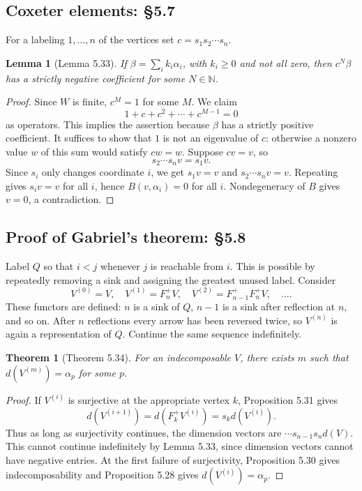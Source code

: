 \documentclass[UTF8,11pt,a4paper]{ctexart}
\newtheorem*{theorem}{Theorem}
\newtheorem*{lemma}{Lemma}
\theoremstyle{definition}\newtheorem*{definition}{Definition}
\theoremstyle{remark}\newtheorem*{remark}{Remark}
\newcommand{\N}{\mathbb N}
\begin{document}
\subsection*{Coxeter elements: §5.7}
For a labeling $1,\ldots,n$ of the vertices set $c=s_1s_2\cdots s_n$.
\begin{lemma}[Lemma 5.33]
If $\beta=\sum_i k_i\alpha_i$, with $k_i\ge0$ and not all zero, then $c^N\beta$ has a strictly negative coefficient for some $N\in\N$.
\end{lemma}
\begin{proof}
Since $W$ is finite, $c^M=1$ for some $M$. We claim
\[
1+c+c^2+\cdots+c^{M-1}=0
\]
as operators. This implies the assertion because $\beta$ has a strictly positive coefficient.
It suffices to show that $1$ is not an eigenvalue of $c$: otherwise a nonzero value $w$ of this sum would satisfy $cw=w$. Suppose $cv=v$, so
\[
s_2\cdots s_nv=s_1v.
\]
Since $s_i$ only changes coordinate $i$, we get $s_1v=v$ and $s_2\cdots s_nv=v$. Repeating gives $s_iv=v$ for all $i$, hence $B(v,\alpha_i)=0$ for all $i$. Nondegeneracy of $B$ gives $v=0$, a contradiction.
\end{proof}

\subsection*{Proof of Gabriel's theorem: §5.8}
Label $Q$ so that $i<j$ whenever $j$ is reachable from $i$. This is possible by repeatedly removing a sink and assigning the greatest unused label. Consider
\[
V^{(0)}=V,\quad V^{(1)}=F_n^+V,\quad
V^{(2)}=F_{n-1}^+F_n^+V,\quad\ldots.
\]
These functors are defined: $n$ is a sink of $Q$, $n-1$ is a sink after reflection at $n$, and so on. After $n$ reflections every arrow has been reversed twice, so $V^{(n)}$ is again a representation of $Q$. Continue the same sequence indefinitely.

\begin{theorem}[Theorem 5.34]
For an indecomposable $V$, there exists $m$ such that $d(V^{(m)})=\alpha_p$ for some $p$.
\end{theorem}
\begin{proof}
If $V^{(i)}$ is surjective at the appropriate vertex $k$, Proposition 5.31 gives
\[
d(V^{(i+1)})=d(F_k^+V^{(i)})=s_k d(V^{(i)}).
\]
Thus as long as surjectivity continues, the dimension vectors are $\cdots s_{n-1}s_nd(V)$. This cannot continue indefinitely by Lemma 5.33, since dimension vectors cannot have negative entries. At the first failure of surjectivity, Proposition 5.30 gives indecomposability and Proposition 5.28 gives $d(V^{(i)})=\alpha_p$.
\end{proof}
\end{document}
